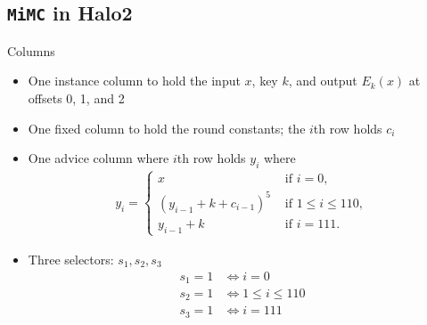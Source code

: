 \documentclass[10pt]{article}
\begin{document}
\subsection{\texttt{MiMC} in Halo2}%
\label{subsec:mimc_in_halo2}
Columns
\begin{itemize}
  \item One instance column to hold the input $x$, key $k$, and output $E_k(x)$ at offsets 0, 1, and 2
  \item One fixed column to hold the round constants; the $i$th row holds $c_i$
  \item One advice column where $i$th row holds $y_i$ where
    \begin{align*}
      y_i = 
      \begin{cases}
        x & \text{ if } i = 0,\\
        (y_{i-1} + k + c_{i-1})^5 & \text{ if } 1 \le i \le  110,\\
        y_{i-1} + k & \text{ if } i=111.
      \end{cases}
    \end{align*}
  \item Three selectors: $s_1,s_2,s_3$
    \begin{align*}
      s_1 = 1 & \iff i=0\\
      s_2 = 1 & \iff 1 \le i\le 110\\
      s_3 = 1 & \iff i=111
    \end{align*}
\end{itemize}
\end{document}
